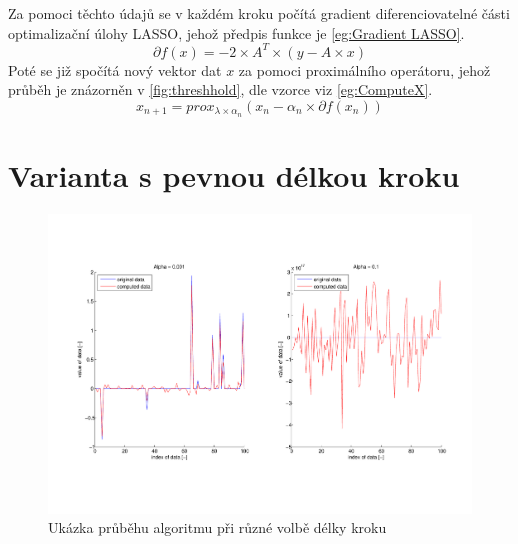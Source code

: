 \documentclass[FM,BP]{tulthesis}
\newcounter{Vzorce}
\begin{document}
Za pomoci těchto údajů se v každém kroku počítá gradient diferenciovatelné části optimalizační úlohy LASSO, jehož předpis funkce je \ref{eg:Gradient LASSO}.
\begin{equation} \label{eg:Gradient LASSO}  \tag{Vzorec \theVzorce}
\partial f(x) = -2 \times A^T \times (y-A \times x)
\end{equation}
Poté se již spočítá nový vektor dat $x$ za pomoci proximálního operátoru, jehož průběh je znázorněn v \ref{fig:threshhold}, dle vzorce viz \ref{eg:ComputeX}. 
\begin{equation} \label{eg:ComputeX}  \tag{Vzorec \theVzorce}
x_{n+1} = prox_{\lambda \times \alpha _{n}}(x_{n}- \alpha _{n} \times \partial f(x_{n}))
\end{equation}

\section{Varianta s pevnou délkou kroku}

\begin{figure}[!ht]
\begin{center}
\includegraphics[scale=0.5]{obr/basic.pdf}
\end{center}
\caption{Ukázka průběhu algoritmu při různé volbě délky kroku}
\label{fig:basicAlpha}
\end{figure} 
\end{document}
